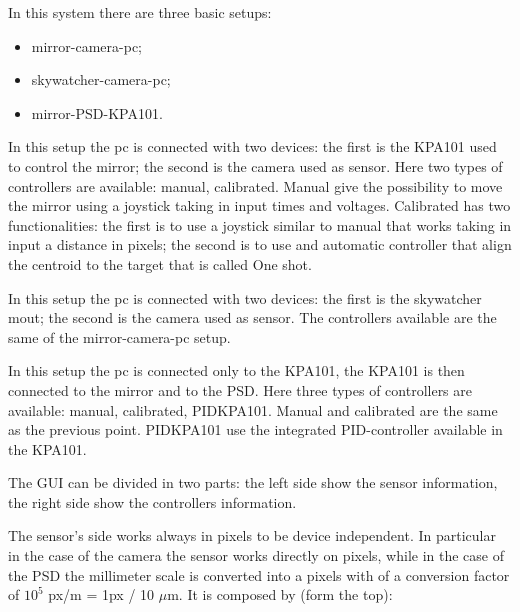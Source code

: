 In this system there are three basic setups:
\begin{itemize}
      \item mirror-camera-pc;
      \item skywatcher-camera-pc;
      \item mirror-PSD-KPA101.
\end{itemize}

In this setup the pc is connected with two devices: the first is
the KPA101 used to control the mirror; the second is the camera used as
sensor. Here two types of controllers are available: manual,
calibrated. Manual give the possibility to move the mirror using a joystick taking
in input times and voltages. Calibrated has two functionalities: the first is to use a joystick
similar to manual that works taking in input a distance in pixels; the
second is to use and automatic controller that align the centroid to the
target that is called One shot.

In this setup the pc is connected with two devices: the first is
the skywatcher mout; the second is the camera used as
sensor. The controllers available are the same of the mirror-camera-pc setup.

In this setup the pc is connected only to the KPA101, the KPA101 is
then connected to the mirror and to the PSD. Here three types of controllers are available: manual, calibrated, PIDKPA101. Manual and calibrated are the same as the previous point. PIDKPA101 use the integrated PID-controller available in the KPA101.



The GUI can be divided in two parts: the left side show the sensor
information, the right side show the controllers information.

The sensor's side works always in pixels to be device independent. In particular in the case of the camera the sensor works directly on pixels, while in the case of the PSD the millimeter scale is converted into a pixels with of a conversion factor of $10^{5}$ px/m = 1px / 10 $\mu$m.
It is composed by (form the top):

